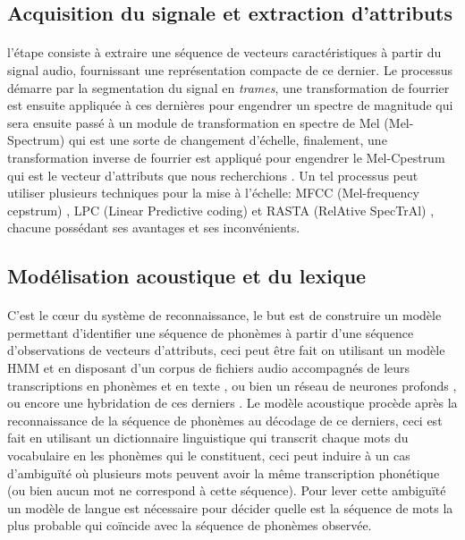 	\subsection{Acquisition du signale et extraction d'attributs}
		\paragraph{}
		l'étape consiste à extraire une séquence de vecteurs caractéristiques à partir du signal audio, fournissant une représentation compacte de ce dernier. Le processus démarre par la segmentation du signal en \textit{trames}, une transformation de fourrier est ensuite appliquée à ces dernières pour engendrer un spectre de magnitude qui sera ensuite passé à un module de transformation en spectre de Mel (Mel-Spectrum) qui est une sorte de changement d'échelle, finalement, une transformation inverse de fourrier est appliqué pour engendrer le Mel-Cpestrum qui est le vecteur d'attributs que nous recherchions \cite{asr_extraction}. Un tel processus peut utiliser plusieurs techniques pour la mise à l'échelle: MFCC (Mel-frequency cepstrum) \cite{MFCC}, LPC (Linear Predictive coding) \cite{LSP} et RASTA (RelAtive SpecTrAl) \cite{RASTA}, chacune possédant ses avantages et ses inconvénients.
	\subsection{Modélisation acoustique et du lexique}
		\paragraph{}
		C'est le cœur du système de reconnaissance, le but est de construire un modèle permettant d'identifier une séquence de phonèmes à partir d'une séquence d'observations de vecteurs d'attributs, ceci peut être fait on utilisant un modèle HMM et en disposant d'un corpus de fichiers audio accompagnés de leurs transcriptions en phonèmes et en texte \cite{hmm_acoustic_model,hmm_formal}, ou bien un réseau de neurones profonds \cite{speech_reco_Yu2015}, ou encore une hybridation de ces derniers \cite{dnn-hmm_acoustic_model}. Le modèle acoustique procède après la reconnaissance de la séquence de phonèmes au décodage de ce derniers, ceci est fait en utilisant un dictionnaire linguistique qui transcrit chaque mots du vocabulaire en les phonèmes qui le constituent, ceci peut induire à un cas d'ambiguïté où plusieurs mots peuvent avoir la même transcription phonétique (ou bien aucun mot ne correspond à cette séquence). Pour lever cette ambiguïté un modèle de langue est nécessaire pour décider quelle est la séquence de mots la plus probable qui coïncide avec la séquence de phonèmes observée.  
